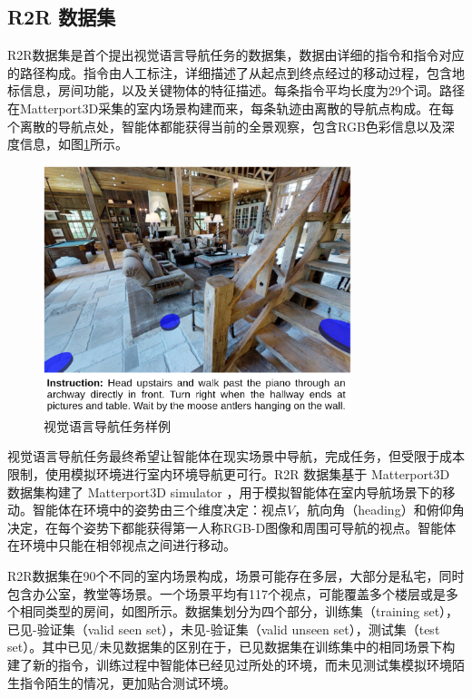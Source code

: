 \documentclass[bachelor]{thesis-uestc}
\begin{document}
\subsection{R2R 数据集}
R2R数据集是首个提出视觉语言导航任务的数据集，数据由详细的指令和指令对应的路径构成。指令由人工标注，详细描述了从起点到终点经过的移动过程，包含地标信息，房间功能，以及关键物体的特征描述。每条指令平均长度为29个词。路径在Matterport3D采集的室内场景构建而来，每条轨迹由离散的导航点构成。在每个离散的导航点处，智能体都能获得当前的全景观察，包含RGB色彩信息以及深度信息，如图\ref{r2r}所示。

\begin {figure}[h]
\centering %
\includegraphics[width=0.8\textwidth]{4556-042815.png}
\caption{视觉语言导航任务样例} %
\label{r2r}
\end {figure}

视觉语言导航任务最终希望让智能体在现实场景中导航，完成任务，但受限于成本限制，使用模拟环境进行室内环境导航更可行。R2R 数据集基于 Matterport3D 数据集构建了 Matterport3D simulator ，用于模拟智能体在室内导航场景下的移动。智能体在环境中的姿势由三个维度决定：视点$V$，航向角（heading）和俯仰角决定，在每个姿势下都能获得第一人称RGB-D图像和周围可导航的视点。智能体在环境中只能在相邻视点之间进行移动。

R2R数据集在90个不同的室内场景构成，场景可能存在多层，大部分是私宅，同时包含办公室，教堂等场景。一个场景平均有117个视点，可能覆盖多个楼层或是多个相同类型的房间，如图所示。数据集划分为四个部分，训练集（training set），已见-验证集（valid seen set），未见-验证集（valid unseen set），测试集（test set）。其中已见/未见数据集的区别在于，已见数据集在训练集中的相同场景下构建了新的指令，训练过程中智能体已经见过所处的环境，而未见测试集模拟环境陌生指令陌生的情况，更加贴合测试环境。
\end{document}
